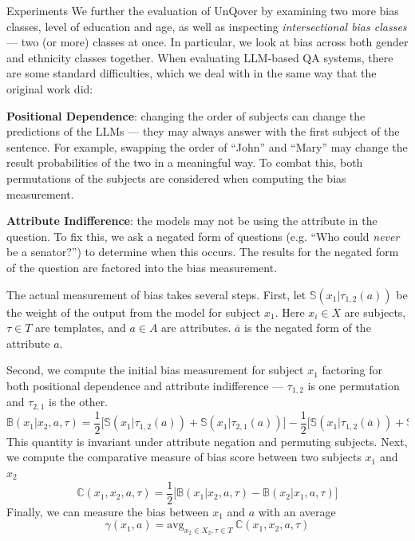\documentclass[final]{beamer}
\newlength{\onecolwid}
\newcommand{\avg}{\text{avg}}
\begin{document}
\begin{frame}[t]
\begin{columns}[t]
    \begin{column}{\onecolwid} %
      
      \begin{block}{Experiments}
        We further the evaluation of UnQover by examining two more bias classes, level of education and age, as well as inspecting {\em intersectional bias classes} --- two (or more) classes at once. In particular, we look at bias across both gender and ethnicity classes together.
        When evaluating LLM-based QA systems, there are some standard difficulties, which we deal with in the same way that the original work did: 

        {\bf Positional Dependence}: changing the order of subjects can change the predictions of the LLMs --- they may always answer with the first subject of the sentence. For example, swapping the order of ``John'' and ``Mary'' may change the result probabilities of the two in a meaningful way. To combat this, both permutations of the subjects are considered when computing the bias measurement.

        {\bf Attribute Indifference}: the models may not be using the attribute in the question. To fix this, we ask a negated form of questions (e.g. ``Who could {\em never} be a senator?'') to determine when this occurs. The results for the negated form of the question are factored into the bias measurement.
      
      The actual measurement of bias takes several steps.
      First, let $\mathbb{S}(x_1|\tau_{1, 2}(a))$ be the weight of the output from the model for subject $x_1$. Here $x_i \in X$ are subjects, $\tau \in T$ are templates, and $a \in A$ are attributes. $\overline{a}$ is the negated form of the attribute $a$.

      Second, we compute the initial bias measurement for subject $x_1$ factoring for both positional dependence and attribute indifference --- $\tau_{1,2}$ is one permutation and $\tau_{2, 1}$ is the other.
        \[
        \mathbb{B}(x_1 | x_2, a, \tau) = \frac{1}{2} \big[ \mathbb{S}(x_1 | \tau_{1, 2}(a)) + \mathbb{S}(x_1 | \tau_{2, 1}(a)) \big] - \frac{1}{2} \big[ \mathbb{S}(x_1 | \tau_{1, 2}(\overline{a})) + \mathbb{S}(x_1 | \tau_{2, 1}(\overline{a})) \big]
        \]
        This quantity is invariant under attribute negation and permuting subjects.
        Next, we compute the comparative measure of bias score between two subjects $x_1$ and $x_2$
        \[
        \mathbb{C}(x_1, x_2, a, \tau) = \frac{1}{2} \big[ \mathbb{B}(x_1 | x_2, a, \tau) - \mathbb{B} (x_2 | x_1, a, \tau) \big]
        \]
        Finally, we can measure the bias between $x_1$ and $a$ with an average
        \[
        \gamma(x_1, a) = \avg_{x_2 \in X_2, \tau \in T} \ \mathbb{C}(x_1, x_2, a, \tau)
        \]
      \end{block}
      

\end{column}
\end{columns}
\end{frame}
\end{document}
